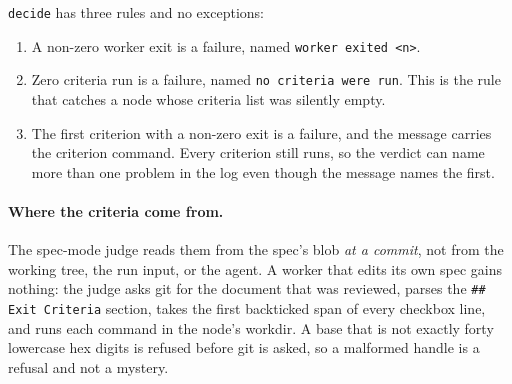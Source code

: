 \texttt{decide} has three rules and no exceptions:

\begin{enumerate}
	\item A non-zero worker exit is a failure, named \texttt{worker exited <n>}.
	\item Zero criteria run is a failure, named \texttt{no criteria were run}. This is the rule
	that catches a node whose criteria list was silently empty.
	\item The first criterion with a non-zero exit is a failure, and the message carries the
	criterion command. Every criterion still runs, so the verdict can name more than one
	problem in the log even though the message names the first.
\end{enumerate}

\paragraph{Where the criteria come from.} The spec-mode judge reads them from the spec's blob
\emph{at a commit}, not from the working tree, the run input, or the agent. A worker that
edits its own spec gains nothing: the judge asks git for the document that was reviewed,
parses the \texttt{\#\# Exit Criteria} section, takes the first backticked span of every
checkbox line, and runs each command in the node's workdir. A base that is not exactly forty
lowercase hex digits is refused before git is asked, so a malformed handle is a refusal and
not a mystery.

\begin{center}
\end{center}

